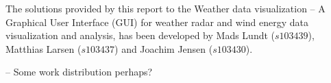 The solutions provided by this report to the Weather data visualization -- A Graphical User Interface (GUI) for weather radar and wind energy data visualization and analysis, has been developed by Mads Lundt ($s103439$), Matthias Larsen ($s103437$) and Joachim Jensen ($s103430$).

-- Some work distribution perhaps?
